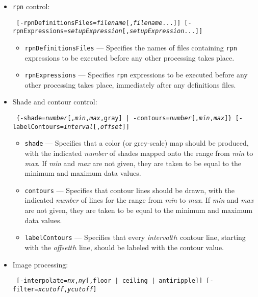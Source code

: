 \begin{itemize}
\begin{itemize}
    \item \verb|rpn| control:
\begin{flushleft}{\tt
[-rpnDefinitionsFiles={\em filename}[,{\em filename}...]]
[-rpnExpressions={\em setupExpression}[,{\em setupExpression}...]]
}\end{flushleft}
        \begin{itemize}
        \item \verb|rpnDefinitionsFiles| --- Specifies the names of files containing \verb|rpn| expressions
        to be executed before any other processing takes place.
        \item \verb|rpnExpressions| --- Specifies \verb|rpn| expressions to be executed before any other processing
         takes place, immediately after any definitions files.
        \end{itemize}
    \item Shade and contour control:
\begin{flushleft}{\tt
\{-shade={\em number}[,{\em min},{\em max},gray] | -contours={\em number}[,{\em min},{\em max}]\}
[-labelContours={\em interval}[,{\em offset}]]
}\end{flushleft}
        \begin{itemize}
        \item \verb|shade| --- Specifies that a color (or grey-scale) map should be produced, with the
        indicated {\em number} of shades mapped onto the range from {\em min} to {\em max}.  If {\em min}
        and {\em max} are not given, they are taken to be equal to the minimum and maximum data values.
        \item \verb|contours| --- Specifies that contour lines should be drawn, with the 
        indicated {\em number} of lines for  the range from {\em min} to {\em max}.  If {\em min}
        and {\em max} are not given, they are taken to be equal to the minimum and maximum data values.
        \item \verb|labelContours| --- Specifies that every {\em interval}$ {th}$ contour line, starting with
        the {\em offset}$ {th}$ line, should be labeled with the contour value.
        \end{itemize}
    \item Image processing:
\begin{flushleft}{\tt
[-interpolate={\em nx},{\em ny}[,{floor | ceiling | antiripple}]] [-filter={\em xcutoff},{\em ycutoff}]
}\end{flushleft}
        \begin{itemize}     

\end{itemize}
\end{itemize}
\end{itemize}
